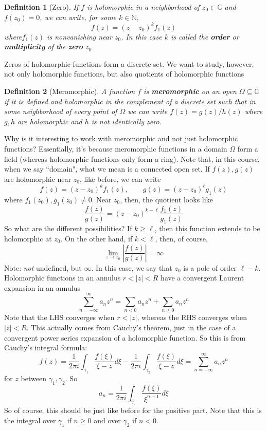 \documentclass{article}
\newcommand{\mbb}[1]{\mathbb{#1}}
\newtheorem{definition}{Definition}
\begin{document}
\begin{definition}[Zero]
If \(f\) is holomorphic in a neighborhood of \(z_0 \in \mbb{C}\) and \(f(z_0) = 0\), we can write, for some \(k \in \mbb{N}\),
\[f(z) = (z - z_0)^kf_1(z)\]
where\(f_1(z)\) is nonvanishing near \(z_0\). In this case \(k\) is called the \textbf{order} or \textbf{multiplicity} of the \textbf{zero} \(z_0\)
\end{definition}
Zeros of holomorphic functions form a discrete set. We want to study, however, not only holomorphic functions, but also quotients of holomorphic functions
\begin{definition}[Meromorphic]
A function \(f\) is \textbf{meromorphic} on an open \(\Omega \subseteq \mbb{C}\) if it is defined and holomorphic in the complement of a discrete set such that in some neighborhood of every point of \(\Omega\) we can write
\(f(z) = g(z)/h(z)\)
where \(g, h\) are holomorphic and \(h\) is not identically zero.
\end{definition}
Why is it interesting to work with meromorphic and not just holomorphic functions? Essentially, it's because meromorphic functions in a domain \(\Omega\) form a field (whereas holomorphic functions only form a ring). Note that, in this course, when we say ``domain", what we mean is a connected open set.
If \(f(z), g(z)\) are holomorphic near \(z_0\), like before, we can write
\[f(z) = (z - z_0)^kf_1(z), \qquad g(z) = (z - z_0)^\ell g_1(z)\]
where \(f_1(z_0), g_1(z_0) \neq 0\). Near \(z_0\), then, the quotient looks like
\[\frac{f(z)}{g(z)} = (z - z_0)^{k - \ell}\frac{f_1(z)}{g_1(z)}\]
So what are the different possibilities? If \(k \geq \ell\), then this function extends to be holomorphic at \(z_0\). On the other hand, if \(k < \ell\), then, of course,
\[\lim_{z \to z_0}\left|\frac{f(z)}{g(z)}\right| = \infty\]
Note: \textit{not} undefined, but \(\infty\). In this case, we say that \(z_0\) is a pole of order \(\ell - k\).
Holomorphic functions in an annulus \(r < |z| < R\) have a convergent Laurent expansion in an annulus
\[\sum_{n = -\infty}^\infty a_nz^n = \sum_{n < 0}a_nz^n + \sum_{n \geq 0}a_nz^n\]
Note that the LHS converges when \(r < |z|\), whereas the RHS converges when \(|z| < R\). This actually comes from Cauchy's theorem, just in the case of a convergent power series expansion of a holomorphic function. So this is from Cauchy's integral formula:
\[f(z) = \frac{1}{2\pi i}\int_{\gamma_1}\frac{f(\xi)}{\xi - z}d\xi - \frac{1}{2\pi i}\int_{\gamma_2}\frac{f(\xi)}{\xi - z}d\xi = \sum_{n = -\infty}^\infty a_nz^n\]
for \(z\) between \(\gamma_1, \gamma_2\).
So
\[a_n = \frac{1}{2\pi i}\int_{\gamma_?}\frac{f(\xi)}{\xi^{n + 1}}d\xi\]
So of course, this should be just like before for the positive part. Note that this is the integral over \(\gamma_1\) if \(n \geq 0\) and over \(\gamma_2\) if \(n < 0\).
\end{document}

